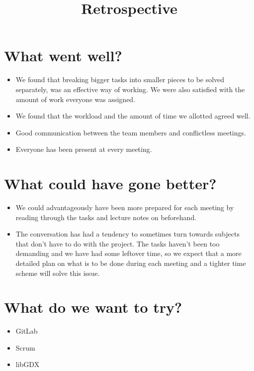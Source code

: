 \documentclass[a4paper]{article}
\title{Retrospective}
\begin{document}
\maketitle

\section{What went well?}

\begin{itemize}
\item We found that breaking bigger tasks into smaller pieces to be solved separately, was an effective way of working. We were also satisfied with the amount of work everyone was assigned.
\item We found that the workload and the amount of time we allotted agreed well.
\item Good communication between the team members and conflictless meetings.  
\item Everyone has been present at every meeting. 
\end{itemize}

\section{What could have gone better?}
\begin{itemize}
\item We could advantageously have been more prepared for each meeting by reading through the tasks and lecture notes on beforehand.  
\item  The conversation has had a tendency to sometimes turn towards subjects that don't have to do with the project. The tasks haven't been too demanding and we have had some leftover time, so we expect that a more detailed plan on what is to be done during each meeting and a tighter time scheme will solve this issue.
\end{itemize}

\section{What do we want to try?}
\begin{itemize}
\item GitLab
\item Scrum 
\item libGDX
\end{itemize}
\end{document}
